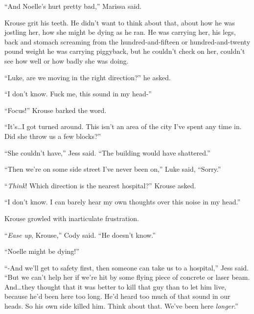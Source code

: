 ``And Noelle's hurt pretty bad,'' Marissa said.



Krouse grit his teeth.  He didn't want to think about that, about how he was jostling her, how she might be dying as he ran.  He was carrying her, his legs, back and stomach screaming from the hundred-and-fifteen or hundred-and-twenty pound weight he was carrying piggyback, but he couldn't check on her, couldn't see how well or how badly she was doing.



``Luke, are we moving in the right direction?'' he asked.



``I don't know.  Fuck me, this sound in my head-''



``Focus!''  Krouse barked the word.



``It's\ldots I got turned around.  This isn't an area of the city I've spent any time in.  Did she throw us a few blocks?''



``She couldn't have,'' Jess said.  ``The building would have shattered.''



``Then we're on some side street I've never been on,'' Luke said, ``Sorry.''



``\emph{Think}!  Which direction is the nearest hospital?'' Krouse asked.



``I don't know.  I can barely hear my own thoughts over this noise in my head.''



Krouse growled with inarticulate frustration.



``\emph{Ease up}, Krouse,'' Cody said.  ``He doesn't know.''



``Noelle might be dying!''



``-And we'll get to safety first, then someone can take us to a hospital,'' Jess said.  ``But we can't help her if we're hit by some flying piece of concrete or laser beam.  And\ldots they thought that it was better to kill that guy than to let him live, because he'd been here too long.  He'd heard too much of that sound in our heads.  So his own side killed him.  Think about that.  We've been here \emph{longer}.''



